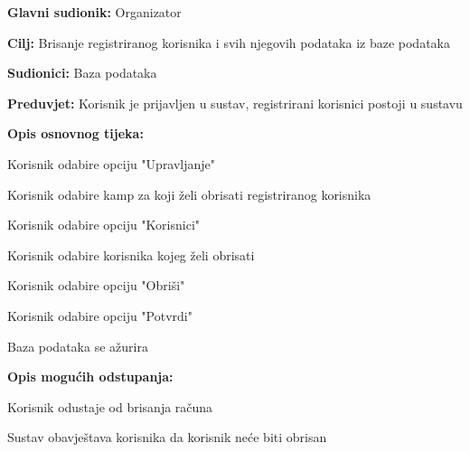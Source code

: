 					\noindent {}
					\begin{packed_item}
						
						\item \textbf{Glavni sudionik: }Organizator
						\item  \textbf{Cilj:} Brisanje registriranog korisnika i svih njegovih podataka iz baze podataka
						\item  \textbf{Sudionici:} Baza podataka
						\item  \textbf{Preduvjet:} Korisnik je prijavljen u sustav, registrirani korisnici postoji u sustavu
						\item  \textbf{Opis osnovnog tijeka:}
						
						\item[] \begin{packed_enum}
							
							\item Korisnik odabire opciju "Upravljanje"
							\item Korisnik odabire kamp za koji želi obrisati registriranog korisnika
							\item Korisnik odabire opciju "Korisnici"
							\item Korisnik odabire korisnika kojeg želi obrisati 
							\item Korisnik odabire opciju "Obriši"
							\item Korisnik odabire opciju "Potvrdi"
							\item Baza podataka se ažurira
						\end{packed_enum}
						
						\item  \textbf{Opis mogućih odstupanja:}
						
						\item[] \begin{packed_item}
							
							\item[3.a] Korisnik odustaje od brisanja računa
							\item[] \begin{packed_enum}
								
								\item Sustav obavještava korisnika da korisnik neće biti obrisan
								
							\end{packed_enum}
							
						\end{packed_item}
					\end{packed_item}
					
